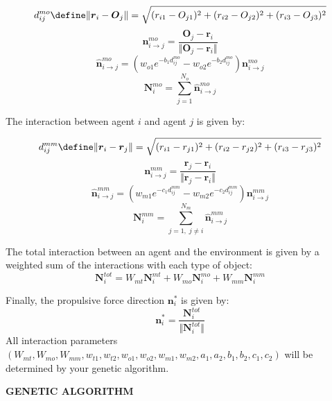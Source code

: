 \documentclass{article}
\begin{document}
\begin{equation}
    d^{mo}_{ij} \define \Vert \boldsymbol{r}_i - \boldsymbol{O}_j \Vert = \sqrt{(r_{i1} - O_{j1})^2 + (r_{i2} - O_{j2})^2 + (r_{i3} - O_{j3})^2}
\end{equation}
\begin{equation}
    \boldsymbol{n}_{i\to j}^{mo}  = \frac{\boldsymbol{O}_j - \boldsymbol{r}_i}{\Vert \boldsymbol{O}_j - \boldsymbol{r}_i \Vert}
\end{equation}
\begin{equation}\label{nMOhat}
    \boldsymbol{\hat{n}}_{i\to j}^{mo} = (w_{o1}e^{-b_1d^{mo}_{ij}} - w_{o2}e^{-b_2d^{mo}_{ij}})\boldsymbol{n}_{i\to j}^{mo}
\end{equation}
\begin{equation}
    \boldsymbol{N}_i^{mo} = \sum_{j = 1}^{N_o}\boldsymbol{\hat{n}}_{i\to j}^{mo}
\end{equation}   

The interaction between agent $i$ and agent $j$ is given by: 

\begin{equation}
    d^{mm}_{ij} \define \Vert \boldsymbol{r}_i - \boldsymbol{r}_j \Vert = \sqrt{(r_{i1} - r_{j1})^2 + (r_{i2} - r_{j2})^2 + (r_{i3} - r_{j3})^2}
\end{equation}
\begin{equation}\label{nMMhat}
    \boldsymbol{n}_{i\to j}^{mm} = \frac{\boldsymbol{r}_j - \boldsymbol{r}_i}{\Vert \boldsymbol{r}_j - \boldsymbol{r}_i \Vert}
\end{equation}
\begin{equation}
    \boldsymbol{\hat{n}}_{i\to j}^{mm} = (w_{m1}e^{-c_1d^{mm}_{ij}} - w_{m2}e^{-c_2d^{mm}_{ij}})\boldsymbol{n}_{i\to j}^{mm}
\end{equation}
\begin{equation}
    \boldsymbol{N}_i^{mm} = \sum_{j = 1, \;j \neq i}^{N_m}\boldsymbol{\hat{n}}_{i\to j}^{mm}
\end{equation}  

The total interaction between an agent and the environment is given by a weighted sum of the interactions with each type of object: 
\begin{equation}\label{Ntot}
\boldsymbol{N}_i^{tot} = W_{mt}\boldsymbol{N}_i^{mt} + W_{mo}\boldsymbol{N}_i^{mo} + W_{mm}\boldsymbol{N}_i^{mm}
\end{equation}

Finally, the propulsive force direction $\boldsymbol{n}^*_i$ is given by: 
\begin{equation}
    \boldsymbol{n}^*_i = \frac{\boldsymbol{N}_i^{tot}}{\Vert \boldsymbol{N}_i^{tot} \Vert} \label{prop_dir}
\end{equation}
All interaction parameters $
( W_{mt}, W_{mo}, W_{mm}, w_{t1}, w_{t2}, w_{o1}, w_{o2}, w_{m1}, w_{m2}, a_1, a_2, b_1, b_2,  c_1, c_2)$ will be determined by your genetic algorithm.
\newpage{}
\centerline{\bf GENETIC ALGORITHM}
\end{document}
